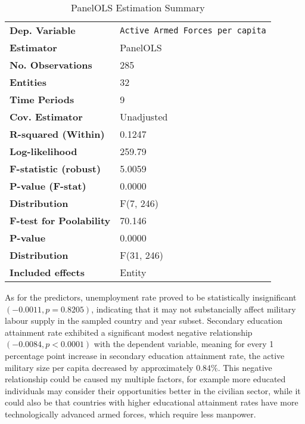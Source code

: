 \begin{table}[htbp]
\centering
\begin{threeparttable}
\caption{PanelOLS Estimation Summary}
\label{tab:panelols_summary}
\begin{tabularx}{\textwidth}{@{}lX@{}}
\toprule
\textbf{Dep. Variable} & \texttt{Active Armed Forces per capita} \\
\textbf{Estimator} & PanelOLS \\
\textbf{No. Observations} & 285 \\
\textbf{Entities} & 32 \\
\textbf{Time Periods} & 9 \\
\textbf{Cov. Estimator} & Unadjusted \\
\midrule
\textbf{R-squared (Within)} & 0.1247 \\
\textbf{Log-likelihood} & 259.79 \\
\textbf{F-statistic (robust)} & 5.0059 \\
\textbf{P-value (F-stat)} & 0.0000 \\
\textbf{Distribution} & F(7, 246) \\
\midrule
\textbf{F-test for Poolability} & 70.146 \\
\textbf{P-value} & 0.0000 \\
\textbf{Distribution} & F(31, 246) \\
\textbf{Included effects} & Entity \\
\bottomrule
\end{tabularx}
\end{threeparttable}
\label{tab:model_summary}
\end{table}

As for the predictors, unemployment rate proved to be statistically insignificant $(-0.0011, p=0.8205)$, 
indicating that it may not substancially affect military labour supply in the sampled country and year subset.
Secondary education attainment rate exhibited a significant modest negative relationship $(-0.0084, p<0.0001)$ 
with the dependent variable, meaning for every 1 percentage point increase in secondary education 
attainment rate, the active military size per capita decreased by approximately 0.84\%.
This negative relationship could be caused my multiple factors, for example more educated individuals 
may consider their opportunities better in the civilian sector, while it could also be that countries 
with higher educational attainment rates have more technologically advanced armed forces, which require 
less manpower.

